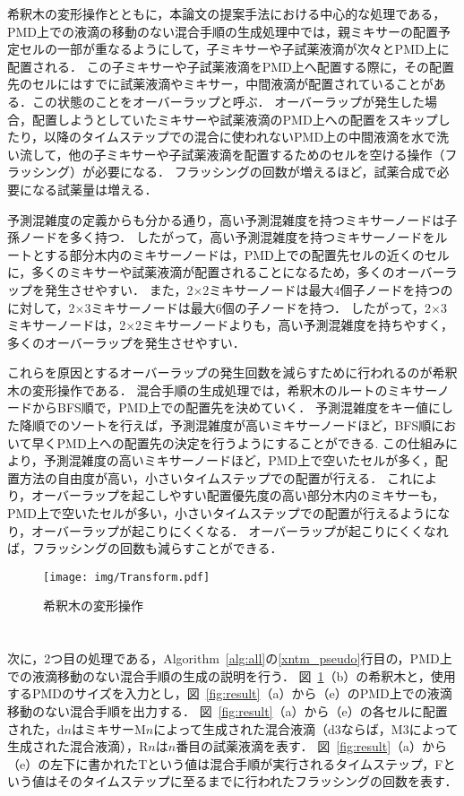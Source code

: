 希釈木の変形操作とともに，本論文の提案手法における中心的な処理である，PMD上での液滴の移動のない混合手順の生成処理中では，親ミキサーの配置予定セルの一部が重なるようにして，子ミキサーや子試薬液滴が次々とPMD上に配置される．
この子ミキサーや子試薬液滴をPMD上へ配置する際に，その配置先のセルにはすでに試薬液滴やミキサー，中間液滴が配置されていることがある．この状態のことをオーバーラップと呼ぶ．
オーバーラップが発生した場合，配置しようとしていたミキサーや試薬液滴のPMD上への配置をスキップしたり，以降のタイムステップでの混合に使われないPMD上の中間液滴を水で洗い流して，他の子ミキサーや子試薬液滴を配置するためのセルを空ける操作（フラッシング）が必要になる．
フラッシングの回数が増えるほど，試薬合成で必要になる試薬量は増える．

予測混雑度の定義からも分かる通り，高い予測混雑度を持つミキサーノードは子孫ノードを多く持つ．
したがって，高い予測混雑度を持つミキサーノードをルートとする部分木内のミキサーノードは，PMD上での配置先セルの近くのセルに，多くのミキサーや試薬液滴が配置されることになるため，多くのオーバーラップを発生させやすい．
また，2$\times$2ミキサーノードは最大4個子ノードを持つのに対して，2$\times$3ミキサーノードは最大6個の子ノードを持つ．
したがって，2$\times$3ミキサーノードは，2$\times$2ミキサーノードよりも，高い予測混雑度を持ちやすく，多くのオーバーラップを発生させやすい．

これらを原因とするオーバーラップの発生回数を減らすために行われるのが希釈木の変形操作である．
混合手順の生成処理では，希釈木のルートのミキサーノードからBFS順で，PMD上での配置先を決めていく．
予測混雑度をキー値にした降順でのソートを行えば，予測混雑度が高いミキサーノードほど，BFS順において早くPMD上への配置先の決定を行うようにすることができる.
この仕組みにより，予測混雑度の高いミキサーノードほど，PMD上で空いたセルが多く，配置方法の自由度が高い，小さいタイムステップでの配置が行える．
これにより，オーバーラップを起こしやすい配置優先度の高い部分木内のミキサーも，PMD上で空いたセルが多い，小さいタイムステップでの配置が行えるようになり，オーバーラップが起こりにくくなる．
オーバーラップが起こりにくくなれば，フラッシングの回数も減らすことができる．

\begin{figure}[tbp]
 \centering\texttt{[image: img/Transform.pdf]}
 \caption{希釈木の変形操作}\label{fig:Transform}
\end{figure}


\section{}
次に，2つ目の処理である，Algorithm~\ref{alg:all}の\ref{xntm_pseudo}行目の，PMD上での液滴移動のない混合手順の生成の説明を行う．
図~\ref{fig:Transform}（b）の希釈木と，使用するPMDのサイズを入力とし，図~\ref{fig:result}（a）から（e）のPMD上での液滴移動のない混合手順を出力する．
図~\ref{fig:result}（a）から（e）の各セルに配置された，d$n$はミキサーM$n$によって生成された混合液滴（d3ならば，M3によって生成された混合液滴），R$n$は$n$番目の試薬液滴を表す．
図~\ref{fig:result}（a）から（e）の左下に書かれたTという値は混合手順が実行されるタイムステップ，Fという値はそのタイムステップに至るまでに行われたフラッシングの回数を表す．

